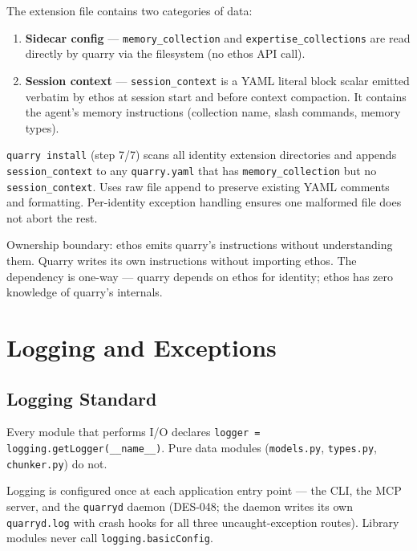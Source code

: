 \documentclass[a4paper,10pt]{article}
\begin{document}
The extension file contains two categories of data:

\begin{enumerate}
  \item \textbf{Sidecar config} --- \texttt{memory\_collection} and
    \texttt{expertise\_collections} are read directly by quarry via the
    filesystem (no ethos API call).
  \item \textbf{Session context} --- \texttt{session\_context} is a YAML
    literal block scalar emitted verbatim by ethos at session start and
    before context compaction.  It contains the agent's memory instructions
    (collection name, slash commands, memory types).
\end{enumerate}

\texttt{quarry install} (step 7/7) scans all identity extension directories
and appends \texttt{session\_context} to any \texttt{quarry.yaml} that has
\texttt{memory\_collection} but no \texttt{session\_context}.  Uses raw file
append to preserve existing YAML comments and formatting.  Per-identity
exception handling ensures one malformed file does not abort the rest.

Ownership boundary: ethos emits quarry's instructions without understanding
them.  Quarry writes its own instructions without importing ethos.  The
dependency is one-way --- quarry depends on ethos for identity; ethos has
zero knowledge of quarry's internals.

\section{Logging and Exceptions}

\subsection{Logging Standard}

Every module that performs I/O declares
\texttt{logger = logging.getLogger(\_\_name\_\_)}.  Pure data modules
(\texttt{models.py}, \texttt{types.py}, \texttt{chunker.py}) do not.

Logging is configured once at each application entry point --- the CLI,
the MCP server, and the \texttt{quarryd} daemon (DES-048; the daemon writes
its own \texttt{quarryd.log} with crash hooks for all three uncaught-exception
routes).  Library modules never call \texttt{logging.basicConfig}.
\end{document}
